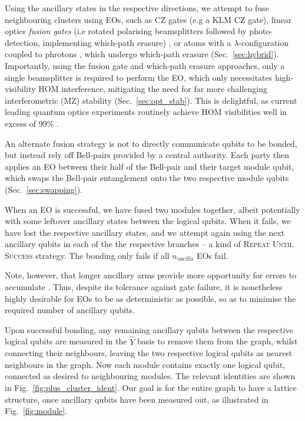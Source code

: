 \documentclass[aps, rmp, twocolumn, amsmath, amssymb, nofootinbib, superscriptaddress, longbibliography, floatfix, table-of-contents, eqsecnum]{revtex4-1}
\begin{document}
Using the ancillary states in the respective directions, we attempt to fuse neighbouring clusters using EOs, such as CZ gates (e.g a KLM CZ gate), linear optics \textit{fusion gates} (i.e rotated polarising beamsplitters followed by photo-detection, implementing which-path erasure) \cite{bib:BrowneRudolph05}, or atoms with a $\lambda$-configuration coupled to phrotons \cite{bib:BarrettKok05}, which undergo which-path erasure (Sec.~\ref{sec:hybrid}). Importantly, using the fusion gate and which-path erasure approaches, only a single beamsplitter is required to perform the EO, which only necessitates high-visibility HOM interference, mitigating the need for far more challenging interferometric (MZ) stability (Sec.~\ref{sec:opt_stab}). This is delightful, as current leading quantum optics experiments routinely achieve HOM visibilities well in excess of 99\% \cite{???}.

An alternate fusion strategy is not to directly communicate qubits to be bonded, but instead rely off Bell-pairs provided by a central authority. Each party then applies an EO between their half of the Bell-pair and their target module qubit, which swaps the Bell-pair entanglement onto the two respective module qubits (Sec.~\ref{sec:swapping}).

When an EO is successful, we have fused two modules together, albeit potentially with some leftover ancillary states between the logical qubits. When it fails, we have lost the respective ancillary states, and we attempt again using the next ancillary qubits in each of the the respective branches -- a kind of \textsc{Repeat Until Success} strategy. The bonding only fails if all $n_\text{ancilla}$ EOs fail.

Note, however, that longer ancillary arms provide more opportunity for errors to accumulate \cite{bib:RohdeRalphMunro07}. Thus, despite its tolerance against gate failure, it is nonetheless highly desirable for EOs to be as deterministic as possible, so as to minimise the required number of ancillary qubits.

Upon successful bonding, any remaining ancillary qubits between the respective logical qubits are measured in the $\hat{Y}$ basis to remove them from the graph, whilst connecting their neighbours, leaving the two respective logical qubits as nearest neighbours in the graph. Now each module contains exactly one logical qubit, connected as desired to neighbouring modules. The relevant identities are shown in Fig.~\ref{fig:plus_cluster_ident}. Our goal is for the entire graph to have a lattice structure, once ancillary qubits have been measured out, as illustrated in Fig.~\ref{fig:module}.
\end{document}
